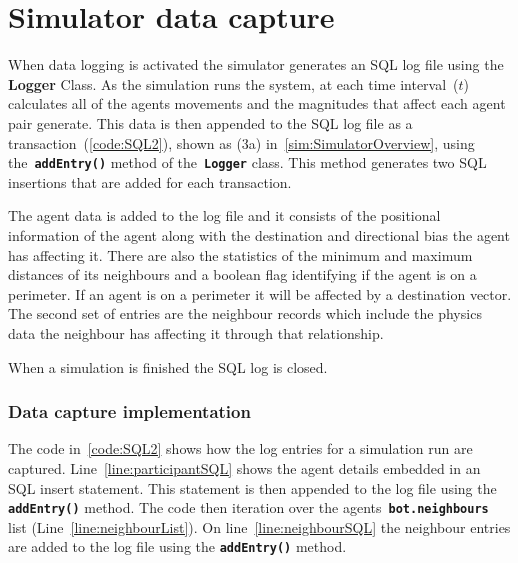 \chapter{Simulator data capture}\label{app5}

When data logging is activated the simulator generates an SQL log file using the \textbf{Logger} Class. As the simulation runs the system, at each time interval~($t$) calculates all of the agents movements and the magnitudes that affect each agent pair generate. This data is then appended to the SQL log file as a transaction~(\autoref{code:SQL2}), shown as (3a) in~\autoref{sim:SimulatorOverview}, using the~\texttt{\textbf{addEntry()}} method of the~\texttt{\textbf{Logger}} class. This method generates two SQL insertions that are added for each transaction. 

The agent data is added to the log file and it consists of the positional information of the agent along with the destination and directional bias the agent has affecting it. There are also the statistics of the minimum and maximum distances of its neighbours and a boolean flag identifying if the agent is on a perimeter. If an agent is on a perimeter it will be affected by a destination vector. The second set of entries are the neighbour records which include the physics data the neighbour has affecting it through that relationship. 

When a simulation is finished the SQL log is closed. 

\subsection{Data capture implementation}
The code in~\autoref{code:SQL2} shows how the log entries for a simulation run are captured. Line~\autoref{line:participantSQL} shows the agent details embedded in an SQL insert statement. This statement is then appended to the log file using the \texttt{\textbf{addEntry()}} method. The code then iteration over the agents~\texttt{\textbf{bot.neighbours}} list (Line~\autoref{line:neighbourList}). On line~\autoref{line:neighbourSQL} the neighbour entries are added to the log file using the \texttt{\textbf{addEntry()}} method.

